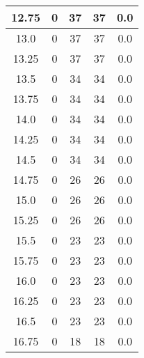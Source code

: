 \documentclass[letterpaper, 12pt]{article}
\begin{document}
\begin{longtable}{|c|c|c|c|c|}
12.75 & 0 & 37 & 37 & 0.0 \\
\hline
13.0 & 0 & 37 & 37 & 0.0 \\
\hline
13.25 & 0 & 37 & 37 & 0.0 \\
\hline
13.5 & 0 & 34 & 34 & 0.0 \\
\hline
13.75 & 0 & 34 & 34 & 0.0 \\
\hline
14.0 & 0 & 34 & 34 & 0.0 \\
\hline
14.25 & 0 & 34 & 34 & 0.0 \\
\hline
14.5 & 0 & 34 & 34 & 0.0 \\
\hline
14.75 & 0 & 26 & 26 & 0.0 \\
\hline
15.0 & 0 & 26 & 26 & 0.0 \\
\hline
15.25 & 0 & 26 & 26 & 0.0 \\
\hline
15.5 & 0 & 23 & 23 & 0.0 \\
\hline
15.75 & 0 & 23 & 23 & 0.0 \\
\hline
16.0 & 0 & 23 & 23 & 0.0 \\
\hline
16.25 & 0 & 23 & 23 & 0.0 \\
\hline
16.5 & 0 & 23 & 23 & 0.0 \\
\hline
16.75 & 0 & 18 & 18 & 0.0 \\
\hline
\end{longtable}
\end{document}
